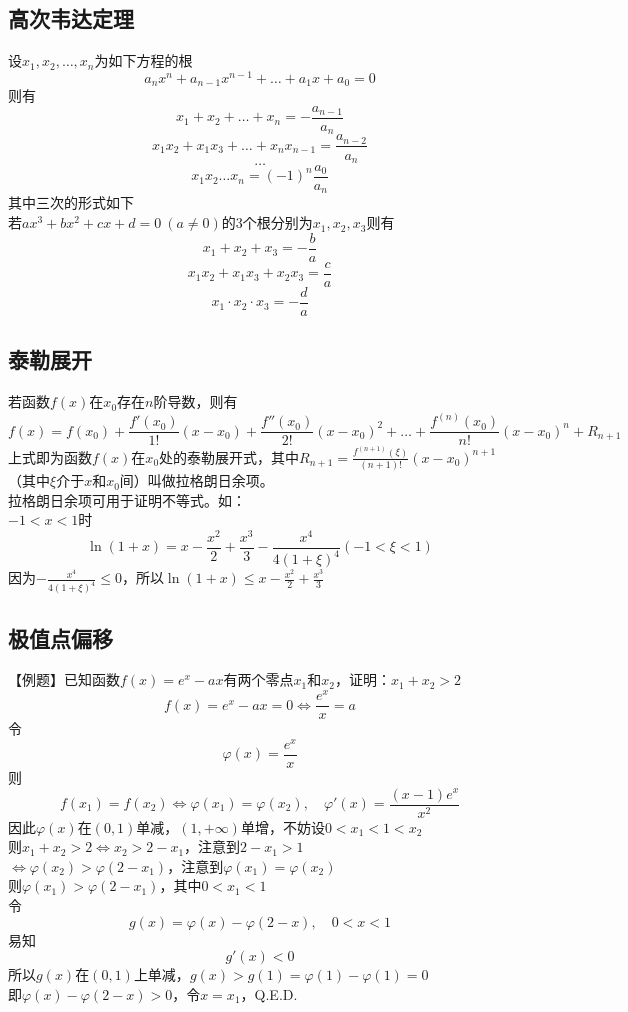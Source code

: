 \documentclass[UTF8]{ctexart}
\begin{document}
		\subsection{高次韦达定理}
			设$x_1,x_2,\dots,x_n$为如下方程的根
			\[a_n x^n+a_{n-1} x^{n-1}+\dots+a_1 x+a_0=0\]
			则有
			\[x_1+x_2+\dots+x_n=-\frac{a_{n-1}}{a_n}\]
			\[x_1 x_2+x_1 x_3+\dots+x_n x_{n-1}=\frac{a_{n-2}}{a_n}\]
			\[\dots\]
			\[x_1 x_2\dots x_n=(-1)^n \frac{a_0}{a_n}\]
			其中三次的形式如下\\
			若$ax^3+bx^2+cx+d=0\ (a\neq 0)$的3个根分别为$x_1,x_2,x_3$则有
			\[x_1+x_2+x_3=-\frac{b}{a}\]
			\[x_1 x_2+x_1 x_3+x_2 x_3=\frac{c}{a}\]
			\[x_1\cdot x_2\cdot x_3=-\frac{d}{a}\]		
		\subsection{泰勒展开}
			若函数$f(x)$在$x_0$存在$n$阶导数，则有
			\[f(x)=f(x_0)+\frac{f'(x_0)}{1!}(x-x_0)+\frac{f''(x_0)}{2!}(x-x_0)^2+\dots+\frac{f^{(n)} (x_0)}{n!}(x-x_0)^n+R_{n+1}\]
			上式即为函数$f(x)$在$x_0$处的泰勒展开式，其中$R_{n+1}=\frac{f^{(n+1)} (\xi)}{(n+1)!}(x-x_0)^{n+1}$（其中$\xi$介于$x$和$x_0$间）叫做拉格朗日余项。\\
			拉格朗日余项可用于证明不等式。如：\\
			$-1<x<1$时
			\[\ln(1+x)=x-\frac{x^2}{2}+\frac{x^3}{3}-\frac{x^4}{4(1+\xi)^4} (-1<\xi<1)\]
			因为$-\frac{x^4}{4(1+\xi)^4}\leq 0$，所以$\ln(1+x)\leq x-\frac{x^2}{2}+\frac{x^3}{3}$
		\subsection{极值点偏移}
			【例题】已知函数$f(x)=e^x-ax$有两个零点$x_1$和$x_2$，证明：$x_1 +x_2 >2$\\
			\[f(x)=e^x-ax=0\Leftrightarrow \frac{e^x}{x}=a\]
			令\[\varphi(x)=\frac{e^x}{x}\]
			则\[f(x_1)=f(x_2)\Leftrightarrow\varphi(x_1)=\varphi(x_2),\quad \varphi'(x)=\frac{(x-1)e^x}{x^2}\]
			因此$\varphi(x)$在$(0,1)$单减，$(1,+\infty)$单增，不妨设$0<x_1<1<x_2$\\
			则$x_1+x_2>2\Leftrightarrow x_2>2-x_1$，注意到$2-x_1>1$\\
			$\Leftrightarrow\varphi(x_2)>\varphi(2-x_1)$，注意到$\varphi(x_1)=\varphi(x_2)$\\
			则$\varphi(x_1)>\varphi(2-x_1)$，其中$0<x_1<1$\\
			令\[g(x)=\varphi(x)-\varphi(2-x), \quad 0<x<1\]
			易知
			\[g'(x)<0\]
			所以$g(x)$在$(0,1)$上单减，$g(x)>g(1)=\varphi(1)-\varphi(1)=0$\\
			即$\varphi(x)-\varphi(2-x)>0$，令$x=x_1$，Q.E.D.
\end{document}
